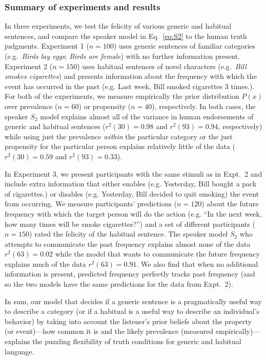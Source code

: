 \documentclass[11pt,letterpaper]{article}
\begin{document}
\subsubsection*{Summary of experiments and results}


In three experiments, we test the felicity of various generic and habitual sentences, and compare the speaker model in Eq.~\ref{eq:S2} to the human truth judgments. 
Experiment 1 ($n=100$) uses generic sentences of familiar categories (e.g.~\emph{Birds lay eggs}; \emph{Birds are female}) with no further information present.
Experiment 2 ($n=150$) uses habitual sentences of novel characters (e.g.~\emph{Bill smokes cigarettes}) and presents information about the frequency with which the event has occurred in the past (e.g. Last week, Bill smoked cigarettes 3 times.). 
For both of the experiments, we measure empirically the prior distribution $P(x)$ over prevalence ($n=60$) or propensity ($n=40$), respectively.
In both cases, the speaker $S_2$ model explains almost all of the variance in human endorsements of generic and habitual sentences ($r^2(30) = 0.98$ and $r^2(93) = 0.94$, respectively) while using just the prevalence \emph{within} the particular category or the just propensity for the particular person explains relatively little of the data ($r^2(30) = 0.59$ and $r^2(93) = 0.33$).

In Experiment 3, we present participants with the same stimuli as in Expt.~2 and include extra information that either enables (e.g. Yesterday, Bill bought a pack of cigarettes.) or disables (e.g. Yesterday, Bill decided to quit smoking) the event from occurring. 
We measure participants' predictions ($n=120$) about the future frequency with which the target person will do the action (e.g. ``In the next week, how many times will be smoke cigarettes?'') and a set of different participants ($n=150$) rated the felicity of the habitual sentence. 
The speaker model $S_2$ who attempts to communicate the past frequency explains almost none of the data $r^2(63)=0.02$ while the model that wants to communicate the future frequency explains much of the data $r^2(63)=0.91$.
We also find that when no additional information is present, predicted frequency perfectly tracks past frequency (and so the two models have the same predictions for the data from Expt.~2).

In sum, our model that decides if a generic sentence is a pragmatically useful way to describe a category (or if a habitual is a useful way to describe an individual's behavior) by taking into account the listener's prior beliefs about the property (or event)---how common it is and the likely prevalence (measured empirically)---explains the puzzling flexibility of truth conditions for generic and habitual language.
\end{document}
